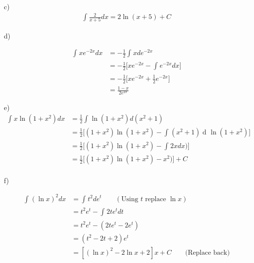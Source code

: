 \documentclass[letterpaper, 11pt]{article}
\newcommand{\1}{\mathds{1}}	%
\DeclareMathOperator*{\dv}{d\!}           %
\theoremstyle{definition}
\begin{document}
  c)
  \begin{align*}
    \int_{}^{}\frac{2}{x + 5} dx = 2\ln (x+5) + C
  \end{align*}

  d)

  \begin{align*}
    \int_{}^{}xe ^{-2x}dx & = -\frac{1}{2}\int_{}^{}x de ^{-2x}                      \\
                          & = -\frac{1}{2}\Big[xe ^{-2x} - \int_{}^{}e ^{-2x}dx\Big] \\
                          & =-\frac{1}{2}\Big[xe ^{-2x} + \frac{1}{2}e ^{-2x}\Big]   \\
                          & = \frac{1-x}{2e ^{2x}}
  \end{align*}

  e)
  \begin{align*}
    \int_{}^{}x \ln(1+x ^{2}) dx & =\frac{1}{2} \int_{}^{}\ln(1+x ^{2}) d(x ^{2}+1)                                         \\
                                 & = \frac{1}{2}\Big[(1+x ^{2})\ln(1+x ^{2}) - \int_{}^{}(x ^{2} + 1)\dv \ln(1+x ^{2})\Big] \\
                                 & =\frac{1}{2}\Big[(1+x ^{2})\ln(1+x ^{2}) - \int_{}^{} 2x
    dx)\Big]                                                                                                                \\
                                 & =\frac{1}{2}\Big[(1+x ^{2})\ln(1+x ^{2}) - x ^{2})\Big] + C                              \\
  \end{align*}


  f)

  \begin{align*}
    \int_{}^{}(\ln x)^{2}dx & = \int_{}^{}t ^{2}de ^{t} \qquad (\text{Using $t$ replace $\ln x$}) \\
                            & =t ^{2}e ^{t} - \int_{}^{}2te ^{t}dt                                \\
                            & =t ^{2}e ^{t} - (2te ^{t} - 2e ^{t})                                \\
                            & =(t ^{2}-2t+2)e ^{t}                                                \\
                            & = [(\ln x)^{2}-2 \ln x + 2]x + C \qquad \text{(Replace back)}
  \end{align*}
\end{document}
